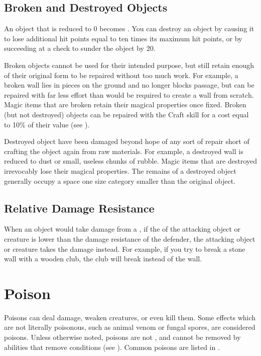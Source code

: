     \subsection{Broken and Destroyed Objects}\label{Broken and Destroyed Objects}
        An object that is reduced to 0  becomes .
        You can destroy an object by causing it to lose additional hit points equal to ten times its maximum hit points, or by succeeding at a check to sunder the object by 20.

        \label{Broken Objects}
        Broken objects cannot be used for their intended purpose, but still retain enough of their original form to be repaired without too much work.
        For example, a broken wall lies in pieces on the ground and no longer blocks passage, but can be repaired with far less effort than would be required to create a wall from scratch.
        Magic items that are broken retain their magical properties once fixed.
        Broken (but not destroyed) objects can be repaired with the Craft skill for a cost equal to 10\% of their value (see ).

        \label{Destroyed Objects}
        Destroyed object have been damaged beyond hope of any sort of repair short of crafting the object again from raw materials.
        For example, a destroyed wall is reduced to dust or small, useless chunks of rubble.
        Magic items that are destroyed irrevocably lose their magical properties.
        The remains of a destroyed object generally occupy a space one size category smaller than the original object.

    \subsection{Relative Damage Resistance}\label{Relative Damage Resistance}
        When an object would take damage from a , if the  of the attacking object or creature is lower than the damage resistance of the defender, the attacking object or creature takes the damage instead.
        For example, if you try to break a stone wall with a wooden club, the club will break instead of the wall.

\section{Poison}\label{Poison}
    Poisons can deal damage, weaken creatures, or even kill them.
    Some effects which are not literally poisonous, such as animal venom or fungal spores, are considered poisons.
    Unless otherwise noted, poisons are not , and cannot be removed by abilities that remove conditions (see ).
    Common poisons are listed in .

